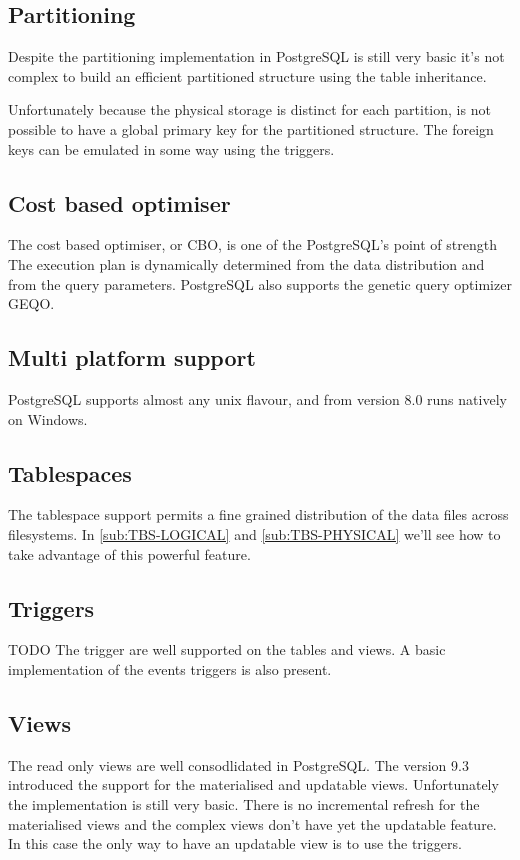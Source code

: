\subsection{Partitioning}
Despite the partitioning implementation in
PostgreSQL is still very basic it's not complex to build an efficient partitioned structure using 
the table inheritance.\newline

Unfortunately because the physical storage is distinct for each partition, is not possible to 
have a global primary key for the partitioned structure. The foreign keys can be emulated in some 
way using the triggers.

\subsection{Cost based optimiser}
The cost based optimiser, or CBO, is one of the PostgreSQL's 
point of strength The execution plan is dynamically determined from the data distribution and from 
the query parameters. PostgreSQL also supports the genetic query optimizer GEQO.


\subsection{Multi platform support}
PostgreSQL supports almost any unix flavour, and from version 8.0 runs natively on 
Windows.

\subsection{Tablespaces}
The tablespace support permits a fine grained distribution of the data files across
filesystems. In \ref{sub:TBS-LOGICAL} and \ref{sub:TBS-PHYSICAL} we'll see how to take advantage of 
this powerful feature.

\subsection{Triggers} TODO
The trigger are well supported on the tables and views. A basic implementation of the events 
triggers is also present.

\subsection{Views}
The read only views are well consodlidated in PostgreSQL.
The version 9.3 introduced the support for the materialised and updatable views.
Unfortunately the implementation is still very basic. There is no incremental refresh for the
materialised views and the complex views don't have yet the updatable feature. In this case the 
only way to have an updatable view is to use the triggers.

